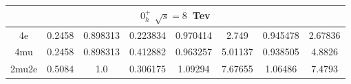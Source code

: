 \begin{table}[b]
\begin{tabular}{c c c c c c c c}
 \multicolumn{8}{|c|}{$0^{+}_{h}$ $\sqrt{s}=8$~Tev} \\ \hline 

4e & 0.2458 & 0.898313 & 0.223834 & 0.970414
 & 2.749%
 & 0.945478 & 2.67836 \\ \hline 
4mu & 0.2458 & 0.898313 & 0.412882 & 0.963257
 & 5.01137%
 & 0.938505 & 4.8826 \\ \hline 
2mu2e & 0.5084 & 1.0  & 0.306175 & 1.09294
 & 7.67655%
 & 1.06486 & 7.4793 \\ \hline \hline 
\end{tabular}
\label{table:HZZ4lyieldcorr_spin0}
\end{table}


